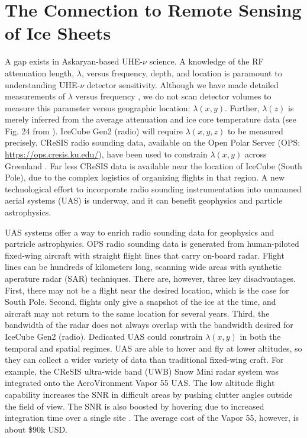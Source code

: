 \documentclass[../../main.tex]{subfiles}
\begin{document}
\section{The Connection to Remote Sensing of Ice Sheets}
\label{sec:cresis}

A gap exists in Askaryan-based UHE-$\nu$ science.  A knowledge of the RF attenuation length, $\lambda$, versus frequency, depth, and location is paramount to understanding UHE-$\nu$ detector sensitivity.  Although we have made detailed measurements of $\lambda$ versus frequency \cite{10.3189/2015jog14j214,10.3189/2015jog15j057,barwick_besson_gorham_saltzberg_2005}, we do not scan detector volumes to measure this parameter versus geographic location: $\lambda(x,y)$.  Further, $\lambda(z)$ is merely inferred from the average attenuation and ice core temperature data (see Fig. 24 from \cite{10.1016/j.astropartphys.2011.11.010}). IceCube Gen2 (radio) will require $\lambda(x,y,z)$ to be measured precisely.  CReSIS radio sounding data, available on the Open Polar Server (OPS: \url{https://ops.cresis.ku.edu/}), have been used to constrain $\lambda(x,y)$ across Greenland \cite{10.1002/2015rs005849}.  Far less CReSIS data is available near the location of IceCube (South Pole), due to the complex logistics of organizing flights in that region.  A new technological effort to incorporate radio sounding instrumentation into unmanned aerial systems (UAS) is underway, and it can benefit geophysics and particle astrophysics. \\ \vspace{2.5mm}

UAS systems offer a way to enrich radio sounding data for geophysics and partricle astrophysics.  OPS radio sounding data is generated from human-piloted fixed-wing aircraft with straight flight lines that carry on-board radar.  Flight lines can be hundreds of kilometers long, scanning wide areas with synthetic aperature radar (SAR) techniques.  There are, however, three key disadvantages.  First, there may not be a flight near the desired location, which is the case for South Pole.  Second, flights only give a snapshot of the ice at the time, and aircraft may not return to the same location for several years.  Third, the bandwidth of the radar does not always overlap with the bandwidth desired for IceCube Gen2 (radio).  Dedicated UAS could constrain $\lambda(x,y)$ in both the temporal and spatial regimes.  UAS are able to hover and fly at lower altitudes, so they can collect a wider variety of data than traditional fixed-wing craft.  For example, the CReSIS ultra-wide band (UWB) Snow Mini radar system was integrated onto the AeroVironment Vapor 55 UAS.  The low altitude flight capability increases the SNR in difficult areas by pushing clutter angles outside the field of view.  The SNR is also boosted by hovering due to increased integration time over a single site  \cite{arnold_2020}. The average cost of the Vapor 55, however, is about \$$90$k USD.  \\ \vspace{2.5mm}
\end{document}
